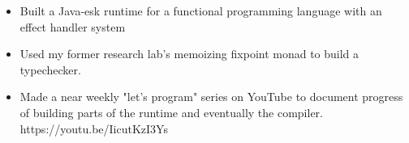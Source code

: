 \begin{itemize}
  \item Built a Java-esk runtime for a functional programming language with an effect handler system
  \item Used my former research lab's memoizing fixpoint monad to build a typechecker.
  \item Made a near weekly "let's program" series on YouTube to document progress of building parts of the runtime and eventually the compiler. https://youtu.be/IicutKzI3Ys
\end{itemize}
\vspace{4pt}
